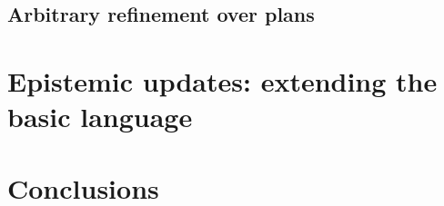 \documentclass[sn-mathphys-num]{sn-jnl}%
\begin{document}
\subsection{Arbitrary refinement over plans}
\label{sec:aref}


% 

\section{Epistemic updates: extending the basic language}
\label{sec:extension}













\section{Conclusions}
\label{sec:final}


%  


% 
\end{document}
